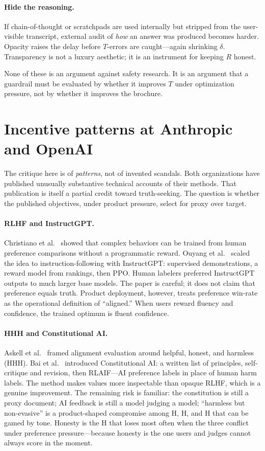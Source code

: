 \documentclass[11pt]{article}
\begin{document}
\paragraph{Hide the reasoning.}
If chain-of-thought or scratchpads are used internally but stripped from the user-visible transcript, external audit of \emph{how} an answer was produced becomes harder. Opacity raises the delay before \(T\)-errors are caught---again shrinking \(\delta\). Transparency is not a luxury aesthetic; it is an instrument for keeping \(R\) honest.

None of these is an argument against safety research. It is an argument that a guardrail must be evaluated by whether it improves \(T\) under optimization pressure, not by whether it improves the brochure.

\section{Incentive patterns at Anthropic and OpenAI}

The critique here is of \emph{patterns}, not of invented scandals. Both organizations have published unusually substantive technical accounts of their methods. That publication is itself a partial credit toward truth-seeking. The question is whether the published objectives, under product pressure, select for proxy over target.

\paragraph{RLHF and InstructGPT.}
Christiano et al.~\cite{christiano2017} showed that complex behaviors can be trained from human preference comparisons without a programmatic reward. Ouyang et al.~\cite{ouyang2022} scaled the idea to instruction-following with InstructGPT: supervised demonstrations, a reward model from rankings, then PPO. Human labelers preferred InstructGPT outputs to much larger base models. The paper is careful; it does not claim that preference equals truth. Product deployment, however, treats preference win-rate as the operational definition of ``aligned.'' When users reward fluency and confidence, the trained optimum is fluent confidence.

\paragraph{HHH and Constitutional AI.}
Askell et al.~\cite{askell2021} framed alignment evaluation around helpful, honest, and harmless (HHH). Bai et al.~\cite{bai2022} introduced Constitutional AI: a written list of principles, self-critique and revision, then RLAIF---AI preference labels in place of human harm labels. The method makes values more inspectable than opaque RLHF, which is a genuine improvement. The remaining risk is familiar: the constitution is still a proxy document; AI feedback is still a model judging a model; ``harmless but non-evasive'' is a product-shaped compromise among H, H, and H that can be gamed by tone. Honesty is the H that loses most often when the three conflict under preference pressure---because honesty is the one users and judges cannot always score in the moment.
\end{document}
